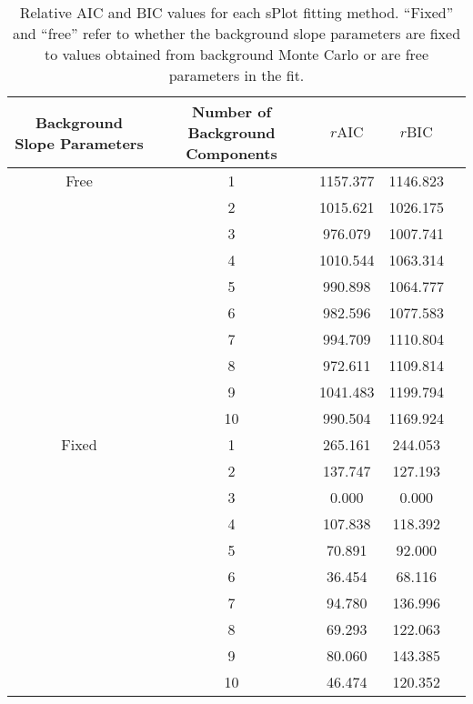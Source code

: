 \begin{table}[ht]
    \begin{center}
        \begin{tabular}{ccccc}\toprule
        Background Slope Parameters & Number of Background Components & $r\text{AIC}$ & $r\text{BIC}$\\\midrule
        Free & 1 & 1157.377 & 1146.823 \\
         & 2 & 1015.621 & 1026.175 \\
         & 3 & 976.079 & 1007.741 \\
         & 4 & 1010.544 & 1063.314 \\
         & 5 & 990.898 & 1064.777 \\
         & 6 & 982.596 & 1077.583 \\
         & 7 & 994.709 & 1110.804 \\
         & 8 & 972.611 & 1109.814 \\
         & 9 & 1041.483 & 1199.794 \\
         & 10 & 990.504 & 1169.924 \\
        Fixed & 1 & 265.161 & 244.053 \\
         & 2 & 137.747 & 127.193 \\
         & 3 & 0.000 & 0.000 \\
         & 4 & 107.838 & 118.392 \\
         & 5 & 70.891 & 92.000 \\
         & 6 & 36.454 & 68.116 \\
         & 7 & 94.780 & 136.996 \\
         & 8 & 69.293 & 122.063 \\
         & 9 & 80.060 & 143.385 \\
         & 10 & 46.474 & 120.352 \\\bottomrule
        \end{tabular}
        \caption{Relative AIC and BIC values for each sPlot fitting method. ``Fixed'' and ``free'' refer to whether the background slope parameters are fixed to values obtained from background Monte Carlo or are free parameters in the fit.}\label{tab:splot-model-results}
    \end{center}
\end{table}